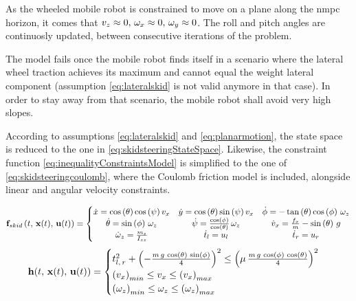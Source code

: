\begin{assumption}
As the wheeled mobile robot is constrained to move on a plane along the \acrshort{nmpc} horizon, it comes that $v_z \approx 0,\, \omega_x \approx 0,\,\omega_y \approx 0$. The roll and pitch angles are continuosly updated, between consecutive iterations of the problem.
\label{eq:planarmotion}
\end{assumption}

The model fails once the mobile robot finds itself in a scenario where the lateral wheel traction achieves its maximum and cannot equal the weight lateral component (assumption \ref{eq:lateralskid} is not valid anymore in that case). In order to stay away from that scenario, the mobile robot shall avoid very high slopes.

According to assumptions \ref{eq:lateralskid} and \ref{eq:planarmotion}, the state space  is reduced to the one in \eqref{eq:skidsteeringStateSpace}. Likewise, the constraint function \eqref{eq:inequalityConstraintsModel} is simplified to the one of \eqref{eq:skidsteeringcoulomb}, where the Coulomb friction model is included, alongside linear and angular velocity constraints.

\begin{equation}
	\mathbf{f}_{skid}\left( t, \,\mathbf{x}(t),\, \mathbf{u}(t) \right) = \left\{\begin{matrix}
		\dot{x} = \cos\left(\theta\right) \cos\left(\psi\right) v_x & \dot{y} = \cos\left(\theta\right) \sin\left(\psi\right)v_x & \dot{\phi} = -\tan\left(\theta\right)\cos\left(\phi\right)\,\omega_z\\
		\dot{\theta} = \sin\left(\phi\right)\,\omega_z &
		\dot{\psi} = \frac{\cos\left(\phi\right)}{\cos\left(\theta\right)}\,\omega_z &
		\dot{v}_x = \frac{f_x}{m} - \sin\left(\theta\right)\,g\\
		\dot{\omega}_z = \frac{m_z}{I_{zz}} &
		\dot{t}_l = u_l &
		\dot{t}_r = u_r
	\end{matrix}\right.
	\label{eq:skidsteeringStateSpace}
\end{equation}
\begin{equation}
\mathbf{h}( t,\,\mathbf{x}(t),\,\mathbf{u}(t) ) = \begin{cases}
t_{l,\,r}^2 + \left(-\frac{ m \, g \, \cos\left(\theta\right) \, \sin\left(\phi\right)}{4}\right)^2 \leq \left(\mu\,\frac{ m \, g \, \cos\left(\phi\right) \, \cos\left(\theta\right)}{4}\right)^2\\
\left(v_x\right)_{min} \leq v_x \leq \left(v_x\right)_{max}\\
\left(\omega_z\right)_{min} \leq \omega_z \leq \left(\omega_z\right)_{max}\\
\end{cases}
\label{eq:skidsteeringcoulomb}
\end{equation}

